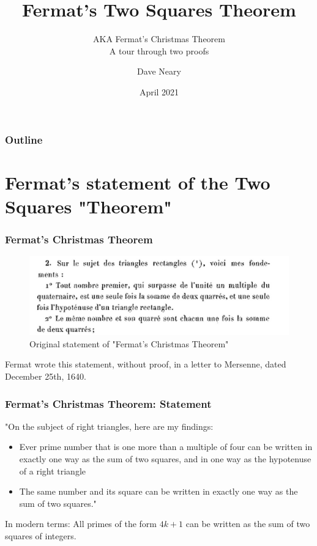 \documentclass{beamer}
\title{Fermat's Two Squares Theorem}
\subtitle{AKA Fermat's Christmas Theorem\\A tour through two proofs}
\author{Dave Neary}
\date{April 2021}
\begin{document}
\frame{\titlepage}

\begin{frame}
	\frametitle{Outline}
	\tableofcontents
\end{frame}

\section{Fermat's statement of the Two Squares "Theorem"}

\begin{frame}
	\frametitle{Fermat's Christmas Theorem}
\begin{figure}
        \includegraphics[width=\linewidth]{extrait_letrre_du_25_decembre_1640.png}
        \caption*{Original statement of "Fermat's Christmas Theorem"}
        \label{fig:fermat1}
\end{figure}

	Fermat wrote this statement, without proof, in a letter to Mersenne, dated December
	25th, 1640.
\end{frame}

\begin{frame}
	\frametitle{Fermat's Christmas Theorem: Statement}
	
"On the subject of right triangles, here are my findings:
	\begin{itemize}
	\item Ever prime number that is one more than a multiple of four can be written in exactly
		one way as the sum of two squares, and in one way as the hypotenuse of a right triangle
	\item The same number and its square can be written in exactly one way as the sum of two squares."
	\end{itemize}

	In modern terms: All primes of the form $4k+1$ can be written as the sum of two squares of integers.
\end{frame}
\end{document}

